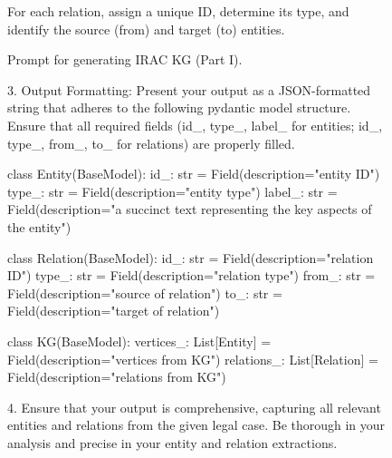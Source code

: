 \begin{figure}[htbp]
\begin{tcolorbox}[enhanced,colback=orange!5!white,colframe=orange!75!black,title=Prompt for Generating IRAC KG (Part I)]
For each relation, assign a unique ID, determine its type, and identify the source (from) and target (to) entities.\newline

\end{tcolorbox}
\caption{Prompt for generating IRAC KG (Part I).}
\label{figure:prompt_kg_part1}
\end{figure}

\begin{figure}[htbp]
\begin{tcolorbox}[enhanced,colback=orange!5!white,colframe=orange!75!black,title=Prompt for Generating IRAC KG (Part II)]

\raggedright

3. Output Formatting:\newline
Present your output as a JSON-formatted string that adheres to the following pydantic model structure. Ensure that all required fields (id\_, type\_, label\_ for entities; id\_, type\_, from\_, to\_ for relations) are properly filled.\newline

class Entity(BaseModel):\newline
    id\_: str = Field(description="entity ID")\newline
    type\_: str = Field(description="entity type")\newline
    label\_: str = Field(description="a succinct text representing the key aspects of the entity")\newline

class Relation(BaseModel):\newline
    id\_: str = Field(description="relation ID")\newline
    type\_: str = Field(description="relation type")\newline
    from\_: str = Field(description="source of relation")\newline
    to\_: str = Field(description="target of relation")\newline

class KG(BaseModel):\newline
    vertices\_: List[Entity] = Field(description="vertices from KG")\newline
    relations\_: List[Relation] = Field(description="relations from KG")\newline

4. Ensure that your output is comprehensive, capturing all relevant entities and relations from the given legal case. Be thorough in your analysis and precise in your entity and relation extractions.\newline


\end{tcolorbox}
\end{figure}
